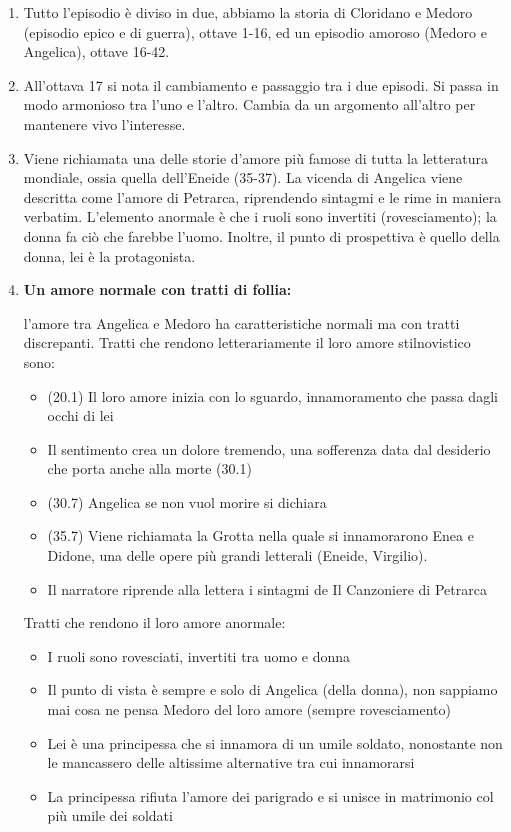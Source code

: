 \documentclass{article}
\begin{document}
\begin{enumerate}
    \item Tutto l'episodio è diviso in due,
    abbiamo la storia di Cloridano e Medoro (episodio epico e di guerra), ottave 1-16, 
    ed un episodio amoroso (Medoro e Angelica), ottave 16-42.
    \item All'ottava 17 si nota il cambiamento e passaggio tra i due episodi.
    Si passa in modo armonioso tra l'uno e l'altro.
    Cambia da un argomento all'altro per mantenere vivo l'interesse.
    \item Viene richiamata una delle storie d'amore più famose di tutta la letteratura mondiale,
    ossia quella dell'Eneide (35-37).
    La vicenda di Angelica viene descritta come l'amore di Petrarca, riprendendo sintagmi
    e le rime in maniera verbatim.
    L'elemento anormale è che i ruoli sono invertiti (rovesciamento); la donna
    fa ciò che farebbe l'uomo. Inoltre, il punto di prospettiva è quello della donna,
    lei è la protagonista.

    \item \textbf{Un amore normale con tratti di follia:}

    l'amore tra Angelica e Medoro ha caratteristiche normali ma con tratti discrepanti.
    Tratti che rendono letterariamente il loro amore stilnovistico sono:
    \begin{itemize}
        \item (20.1) Il loro amore inizia con lo sguardo, innamoramento che passa dagli occhi di lei
        \item Il sentimento crea un dolore tremendo, una sofferenza data dal desiderio che porta anche
        alla morte (30.1)
        \item (30.7) Angelica se non vuol morire si dichiara
        \item (35.7) Viene richiamata la Grotta nella quale si innamorarono Enea e Didone, una delle opere più grandi letterali (Eneide, Virgilio).
        \item Il narratore riprende alla lettera i sintagmi de Il Canzoniere di Petrarca
    \end{itemize}
    Tratti che rendono il loro amore anormale:
    \begin{itemize}
        \item I ruoli sono rovesciati, invertiti tra uomo e donna
        \item Il punto di vista è sempre e solo di Angelica (della donna), non sappiamo mai cosa ne pensa Medoro del loro amore (sempre rovesciamento)
        \item Lei è una principessa che si innamora di un umile soldato, nonostante non le mancassero delle altissime alternative tra cui innamorarsi
        \item La principessa rifiuta l'amore dei parigrado e si unisce in matrimonio col più umile dei soldati
    \end{itemize}
    

\end{enumerate}
\end{document}
